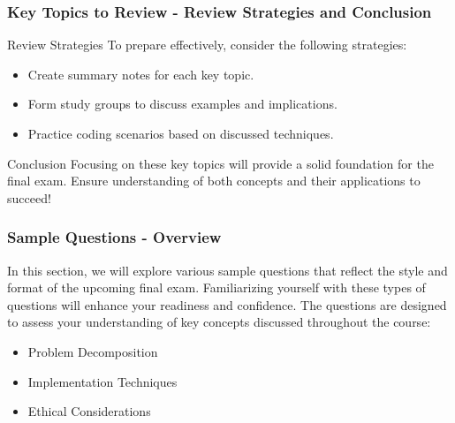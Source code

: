 \documentclass[aspectratio=169]{beamer}
\begin{document}
\begin{frame}[fragile]
    \frametitle{Key Topics to Review - Review Strategies and Conclusion}
    \begin{block}{Review Strategies}
        To prepare effectively, consider the following strategies:
        \begin{itemize}
            \item Create summary notes for each key topic.
            \item Form study groups to discuss examples and implications.
            \item Practice coding scenarios based on discussed techniques.
        \end{itemize}
    \end{block}

    \begin{block}{Conclusion}
        Focusing on these key topics will provide a solid foundation for the final exam. 
        Ensure understanding of both concepts and their applications to succeed!
    \end{block}
\end{frame}

\begin{frame}[fragile]
    \frametitle{Sample Questions - Overview}
    In this section, we will explore various sample questions that reflect the style and format of the upcoming final exam. Familiarizing yourself with these types of questions will enhance your readiness and confidence. The questions are designed to assess your understanding of key concepts discussed throughout the course:
    
    \begin{itemize}
        \item Problem Decomposition
        \item Implementation Techniques
        \item Ethical Considerations
    \end{itemize}
\end{frame}
\end{document}

